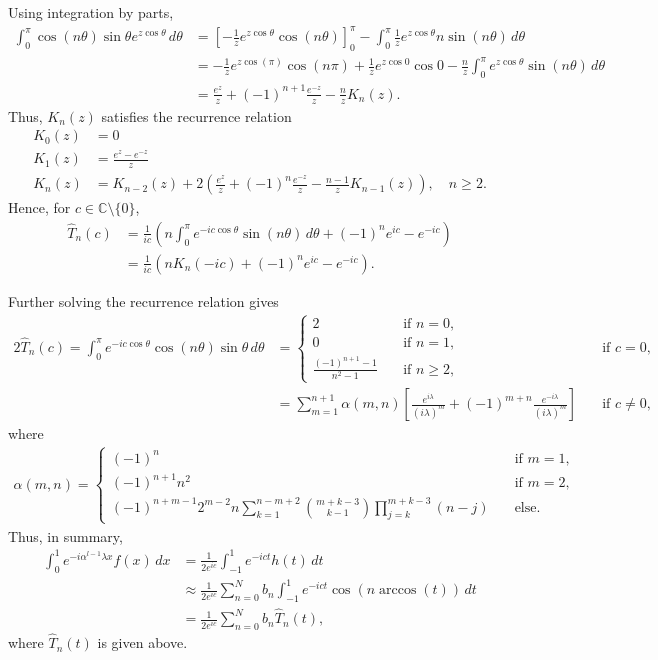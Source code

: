 \documentclass[12pt, oneside, a4paper]{article}
\begin{document}
Using integration by parts,
\begin{align*}
\int_0^{\pi}\cos(n\theta)\sin\theta e^{z\cos\theta}\,d\theta &= \left[-\frac{1}{z}e^{z\cos\theta}\cos(n\theta)\right]_0^{\pi} - \int_0^{\pi}\frac{1}{z}e^{z\cos\theta}n\sin(n\theta)\,d\theta\\
&= -\frac{1}{z}e^{z\cos(\pi)}\cos(n\pi) + \frac{1}{z}e^{z\cos 0}\cos 0 - \frac{n}{z}\int_0^{\pi}e^{z\cos\theta}\sin(n\theta)\,d\theta\\
&= \frac{e^z}{z} + (-1)^{n+1}\frac{e^{-z}}{z} - \frac{n}{z}K_n(z).
\end{align*}
Thus, $K_n(z)$ satisfies the recurrence relation
\begin{align*}
K_0(z) &= 0\\
K_1(z) &= \frac{e^z-e^{-z}}{z}\\
K_{n}(z) &= K_{n-2}(z) + 2\left(\frac{e^z}{z} + (-1)^{n}\frac{e^{-z}}{z} - \frac{n-1}{z}K_{n-1}(z)\right),\quad n\geq 2.
\end{align*}
Hence, for $c\in\mathbb{C}\setminus\{0\}$,
\begin{align*}
\hat{T}_n(c) &= \frac{1}{ic}\left(n\int_0^{\pi}e^{-ic\cos\theta}\sin(n\theta)\,d\theta + (-1)^n e^{ic}- e^{-ic}\right)\\
&= \frac{1}{ic}\left(nK_n(-ic) + (-1)^n e^{ic} - e^{-ic}\right).
\end{align*}

Further solving the recurrence relation \cite{Fokas2012} gives
\begin{alignat*}{2}
    \hat{T}_n(c) = \int_0^\pi e^{-ic\cos\theta}\cos(n\theta)\sin\theta\,d\theta &= 
    \begin{cases}
        2 &\quad\mbox{if $n=0$},\\
        0 &\quad\mbox{if $n=1$},\\
        \frac{(-1)^{n+1}-1}{n^2-1} &\quad\mbox{if $n\geq 2$},
    \end{cases}
    &\quad\mbox{if $c=0$},\\
    &= \sum_{m=1}^{n+1}\alpha(m,n)\left[\frac{e^{i\lambda}}{(i\lambda)^m} + (-1)^{m+n}\frac{e^{-i\lambda}}{(i\lambda)^m}\right]&\quad\mbox{if $c\neq 0$},
\end{alignat*}
where
\begin{align*}
\alpha(m,n) =
\begin{cases}
(-1)^n&\quad\mbox{if $m=1$},\\
(-1)^{n+1}n^2&\quad\mbox{if $m=2$},\\
(-1)^{n+m-1}2^{m-2}n\sum_{k=1}^{n-m+2}\binom{m+k-3}{k-1}\prod_{j=k}^{m+k-3}(n-j)&\quad\mbox{else}.
\end{cases}
\end{align*}
Thus, in summary,
\begin{align*}
    \int_0^1 e^{-i\alpha^{l-1}\lambda x}f(x)\,dx &= \frac{1}{2e^{ic}}\int_{-1}^1 e^{-ict} h(t)\,dt\\
    &\approx \frac{1}{2e^{ic}}\sum_{n=0}^N b_n \int_{-1}^1 e^{-ict}\cos(n \arccos(t))\,dt\\
    &= \frac{1}{2e^{ic}}\sum_{n=0}^N b_n \hat{T}_n(t),
\end{align*}
where $\hat{T}_n(t)$ is given above.
\end{document}
